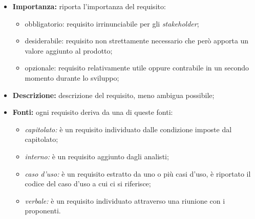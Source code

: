 \begin{itemize}
    \item \textbf{Importanza:} riporta l'importanza del requisito:
          \begin{itemize}
              \item obbligatorio: requisito irrinunciabile per gli \textit{stakeholder};
              \item desiderabile: requisito non strettamente necessario che però apporta un valore aggiunto al prodotto;
              \item opzionale: requisito relativamente utile oppure contrabile in un secondo momento durante lo sviluppo;
          \end{itemize}
    \item \textbf{Descrizione:} descrizione del requisito, meno ambigua possibile;
    \item \textbf{Fonti:} ogni requisito deriva da una di queste fonti:
          \begin{itemize}
              \item \textit{capitolato:} è un requisito individuato dalle condizione imposte dal capitolato;
              \item \textit{interno:} è un requisito aggiunto dagli analisti;
              \item \textit{caso d'uso:} è un requisito estratto da uno o più casi d'uso, è riportato il codice del caso d'uso a cui ci si riferisce;
              \item \textit{verbale:} è un requisito individuato attraverso una riunione con i proponenti.
          \end{itemize}
\end{itemize}

\newpage
